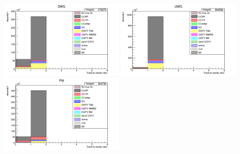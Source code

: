 \documentclass[%
 reprint,
 amsmath,amssymb,
 aps,
]{revtex4-2}
\begin{document}
    \includegraphics[width=0.45\textwidth]{images/track_to_cluster_hits_ratio_wgbm_topo_DWG_accum_level[][26]_data_mc.png}
    \includegraphics[width=0.45\textwidth]{images/track_to_cluster_hits_ratio_wgbm_topo_UWG_accum_level[][16]_data_mc.png}
    \includegraphics[width=0.45\textwidth]{images/track_to_cluster_hits_ratio_wgbm_topo_PM_accum_level[][06]_data_mc.png}
\end{document}

